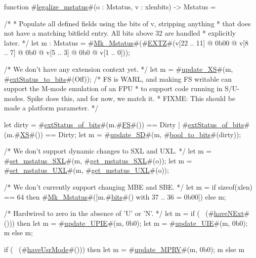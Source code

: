 function #\hyperref[sailRISCVzlegalizzezymstatus]{legalize\_mstatus}#(o : Mstatus, v : xlenbits) -> Mstatus = {
  /*
   * Populate all defined fields using the bits of v, stripping anything
   * that does not have a matching bitfield entry. All bits above 32 are handled
   * explicitly later.
   */
  let m : Mstatus = #\hyperref[sailRISCVzMkzyMstatus]{Mk\_Mstatus}#(#\hyperref[sailRISCVzEXTZ]{EXTZ}#(v[22 .. 11] @ 0b00 @ v[8 .. 7] @ 0b0 @ v[5 .. 3] @ 0b0 @ v[1 .. 0]));

  /* We don't have any extension context yet. */
  let m = #\hyperref[sailRISCVzupdatezyXS]{update\_XS}#(m, #\hyperref[sailRISCVzextStatuszytozybits]{extStatus\_to\_bits}#(Off));
  /* FS is WARL, and making FS writable can support the M-mode emulation of an FPU
   * to support code running in S/U-modes.  Spike does this, and for now, we match it.
   * FIXME: This should be made a platform parameter.
   */

  let dirty = #\hyperref[sailRISCVzextStatuszyofzybits]{extStatus\_of\_bits}#(m.#\hyperref[sailRISCVzFS]{FS}#()) == Dirty | #\hyperref[sailRISCVzextStatuszyofzybits]{extStatus\_of\_bits}#(m.#\hyperref[sailRISCVzXS]{XS}#()) == Dirty;
  let m = #\hyperref[sailRISCVzupdatezySD]{update\_SD}#(m, #\hyperref[sailRISCVzboolzytozybits]{bool\_to\_bits}#(dirty));

  /* We don't support dynamic changes to SXL and UXL. */
  let m = #\hyperref[sailRISCVzsetzymstatuszySXL]{set\_mstatus\_SXL}#(m, #\hyperref[sailRISCVzgetzymstatuszySXL]{get\_mstatus\_SXL}#(o));
  let m = #\hyperref[sailRISCVzsetzymstatuszyUXL]{set\_mstatus\_UXL}#(m, #\hyperref[sailRISCVzgetzymstatuszyUXL]{get\_mstatus\_UXL}#(o));

  /* We don't currently support changing MBE and SBE. */
  let m = if sizeof(xlen) == 64 then {
             #\hyperref[sailRISCVzMkzyMstatus]{Mk\_Mstatus}#([m.#\hyperref[sailRISCVzbits]{bits}#() with 37 .. 36 = 0b00])
          } else m;

  /* Hardwired to zero in the absence of 'U' or 'N'. */
  let m = if (~ (#\hyperref[sailRISCVzhaveNExt]{haveNExt}#())) then {
             let m = #\hyperref[sailRISCVzupdatezyUPIE]{update\_UPIE}#(m, 0b0);
             let m = #\hyperref[sailRISCVzupdatezyUIE]{update\_UIE}#(m, 0b0);
             m
          } else m;

  if (~ (#\hyperref[sailRISCVzhaveUsrMode]{haveUsrMode}#())) then {
    let m = #\hyperref[sailRISCVzupdatezyMPRV]{update\_MPRV}#(m, 0b0);
    m
  } else m
}
